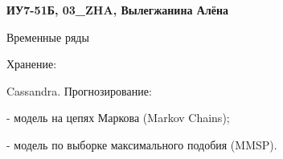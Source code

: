 \documentclass[a4paper,14pt, unknownkeysallowed]{extreport}
\begin{document}
   \textbf {ИУ7-51Б, 03\_ZHA, Вылегжанина Алёна}

   Временные ряды

   Хранение:

   Cassandra.
   Прогнозирование:

   - модель на цепях Маркова (Markov Chains);

   - модель по выборке максимального подобия (MMSP).
   
   
   
   
\end{document}
